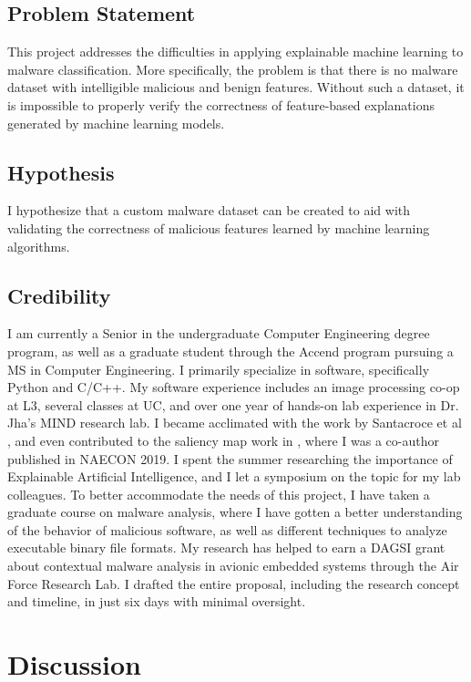 \documentclass[12pt, letterpaper, titlepage]{article}
\begin{document}
\subsection{Problem Statement}
This project addresses the difficulties in applying explainable machine learning to malware classification.
More specifically, the problem is that there is no malware dataset with intelligible malicious and benign features.
Without such a dataset, it is impossible to properly verify the correctness of feature-based explanations generated by machine learning models.

\subsection{Hypothesis}
I hypothesize that a custom malware dataset can be created to aid with validating the correctness of malicious features learned by machine learning algorithms.

\subsection{Credibility}
I am currently a Senior in the undergraduate Computer Engineering degree program, as well as a graduate student through the Accend program pursuing a MS in Computer Engineering.
I primarily specialize in software, specifically Python and C/C++.
My software experience includes an image processing co-op at L3, several classes at UC, and over one year of hands-on lab experience in Dr. Jha's MIND research lab.
I became acclimated with the work by Santacroce et al \cite{SantacroceMaV}, and even contributed to the saliency map work in \cite{SantacroceSalience}, where I was a co-author published in NAECON 2019.
I spent the summer researching the importance of Explainable Artificial Intelligence, and I let a symposium on the topic for my lab colleagues.
To better accommodate the needs of this project, I have taken a graduate course on malware analysis, where I have gotten a better understanding of the behavior of malicious software, as well as different techniques to analyze executable binary file formats.
My research has helped to earn a DAGSI grant about contextual malware analysis in avionic embedded systems through the Air Force Research Lab.
I drafted the entire proposal, including the research concept and timeline, in just six days with minimal oversight.

\pagebreak

\section{Discussion}
\end{document}
